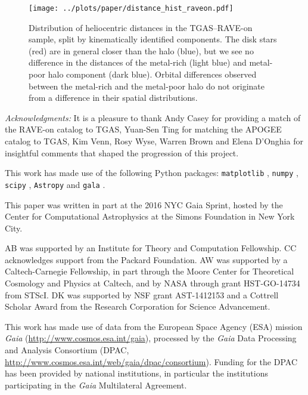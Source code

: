 \documentclass[apj, twocolappendix, numberedappendix, appendixfloats]{emulateapj}
\begin{document}
\begin{figure}
\begin{center}
\texttt{[image: ../plots/paper/distance\_hist\_raveon.pdf]}
\caption{Distribution of heliocentric distances in the TGAS--RAVE-on sample, split by kinematically identified components.
The disk stars (red) are in general closer than the halo (blue), but we see no difference in the distances of the metal-rich (light blue) and metal-poor halo component (dark blue).
Orbital differences observed between the metal-rich and the metal-poor halo do not originate from a difference in their spatial distributions.
}
\label{fig:distance}
\end{center}
\end{figure}

\vspace{0.5cm}
\emph{Acknowledgments:}
It is a pleasure to thank Andy Casey for providing a match of the RAVE-on catalog to TGAS, Yuan-Sen Ting for matching the APOGEE catalog to TGAS, Kim Venn, Rosy Wyse, Warren Brown and Elena D'Onghia for insightful comments that shaped the progression of this project.

This work has made use of the following Python packages: \texttt{matplotlib} \citep{mpl}, \texttt{numpy} \citep{numpy}, \texttt{scipy} \citep{scipy}, \texttt{Astropy} \citep{astropy} and \texttt{gala} \citep{gala}.

This paper was written in part at the 2016 NYC Gaia Sprint, hosted by the Center for Computational Astrophysics at the Simons Foundation in New York City.

AB was supported by an Institute for Theory and Computation Fellowship.
CC acknowledges support from the Packard Foundation.
AW was supported by a Caltech-Carnegie Fellowship, in part through the Moore Center for Theoretical Cosmology and Physics at Caltech, and by NASA through grant HST-GO-14734 from STScI.
DK was supported by NSF grant AST-1412153 and a Cottrell Scholar Award from the Research Corporation for Science Advancement.

This work has made use of data from the European Space Agency (ESA) mission {\it Gaia} (\url{http://www.cosmos.esa.int/gaia}), processed by the {\it Gaia} Data Processing and Analysis Consortium (DPAC, \url{http://www.cosmos.esa.int/web/gaia/dpac/consortium}). Funding for the DPAC has been provided by national institutions, in particular the institutions participating in the {\it Gaia} Multilateral Agreement.
\end{document}
